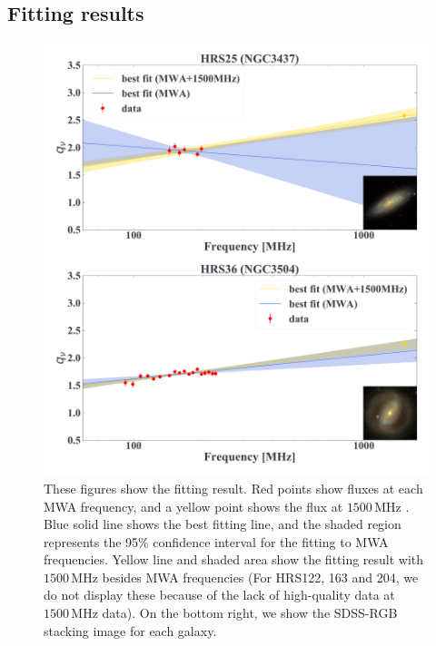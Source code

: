 \documentclass[12pt,a4paper,twoside,openright,final,titlepage]{report}
\newcommand{\MHz}{\,\mathrm{MHz}}
\begin{document}
\begin{appendices}
\chapter{Fitting results}\label{chap:fittingresults}
\begin{figure}[htbp]
    \centering
    \includegraphics[width=.8\linewidth]{Figures/AppendixC_qfitting1.pdf}
    \caption[Fitting results for 18 samples (1)]{\label{fig:fittingresults1}
        These figures show the fitting result.
        Red points show fluxes at each MWA frequency, and a yellow point shows the flux at $1500\MHz$ \citep{Boselli2015}.
        Blue solid line shows the best fitting line, and the shaded region represents the 95\% confidence interval for the fitting to MWA frequencies.
        Yellow line and shaded area show the fitting result with $1500\MHz$ besides MWA frequencies (For HRS122, 163 and 204, we do not display these because of the lack of high-quality data at $1500\MHz$ data).
        On the bottom right, we show the SDSS-RGB stacking image for each galaxy.
    }
\end{figure}


\end{appendices}
\end{document}
